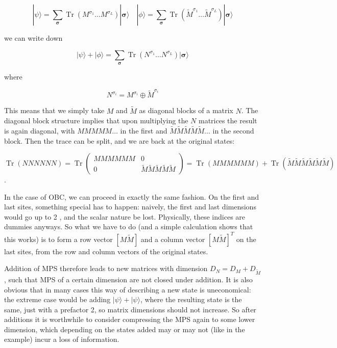 \documentclass[12pt]{article}
\begin{document}
\begin{equation*}
|\psi\rangle=\sum_{\boldsymbol{\sigma}} \operatorname{Tr}\left(M^{\sigma_{1}} \ldots M^{\sigma_{L}}\right)|\boldsymbol{\sigma}\rangle \quad|\phi\rangle=\sum_{\boldsymbol{\sigma}} \operatorname{Tr}\left(\tilde{M}^{\sigma_{1}} \ldots \tilde{M}^{\sigma_{L}}\right)|\boldsymbol{\sigma}\rangle \tag{131}
\end{equation*}


we can write down


\begin{equation*}
|\psi\rangle+|\phi\rangle=\sum_{\boldsymbol{\sigma}} \operatorname{Tr}\left(N^{\sigma_{1}} \ldots N^{\sigma_{L}}\right)|\boldsymbol{\sigma}\rangle \tag{132}
\end{equation*}


where


\begin{equation*}
N^{\sigma_{i}}=M^{\sigma_{i}} \oplus \tilde{M}^{\sigma_{i}} \tag{133}
\end{equation*}


This means that we simply take $M$ and $\tilde{M}$ as diagonal blocks of a matrix $N$. The diagonal block structure implies that upon multiplying the $N$ matrices the result is again diagonal, with $M M M M M \ldots$ in the first and $\tilde{M} \tilde{M} \tilde{M} \tilde{M} \tilde{M} \ldots$ in the second block. Then the trace can be split, and we are back at the original states:

$\operatorname{Tr}(N N N N N N)=\operatorname{Tr}\left(\begin{array}{cc}M M M M M M & 0 \\ 0 & \tilde{M} \tilde{M} \tilde{M} \tilde{M} \tilde{M}\end{array}\right)=\operatorname{Tr}(M M M M M M)+\operatorname{Tr}(\tilde{M} \tilde{M} \tilde{M} \tilde{M} \tilde{M} \tilde{M})$.

In the case of OBC, we can proceed in exactly the same fashion. On the first and last sites, something special has to happen: naively, the first and last dimensions would go up to 2 , and the scalar nature be lost. Physically, these indices are dummies anyways. So what we have to do (and a simple calculation shows that this works) is to form a row vector $[M \tilde{M}]$ and a column vector $[M \tilde{M}]^{T}$ on the last sites, from the row and column vectors of the original states.

Addition of MPS therefore leads to new matrices with dimension $D_{N}=D_{M}+D_{\tilde{M}}$, such that MPS of a certain dimension are not closed under addition. It is also obvious that in many cases this way of describing a new state is uneconomical: the extreme case would be adding $|\psi\rangle+|\psi\rangle$, where the resulting state is the same, just with a prefactor 2, so matrix dimensions should not increase. So after additions it is worthwhile to consider compressing the MPS again to some lower dimension, which depending on the states added may or may not (like in the example) incur a loss of information.
\end{document}
